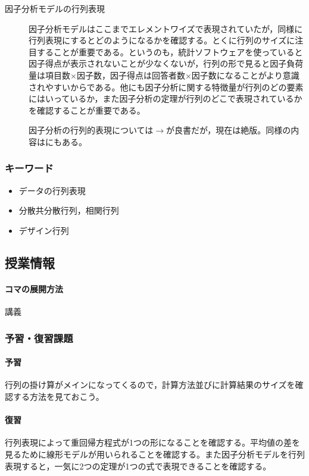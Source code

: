 \begin{description}
	\item[因子分析モデルの行列表現]因子分析モデルはここまでエレメントワイズで表現されていたが，同様に行列表現にするとどのようになるかを確認する。とくに行列のサイズに注目することが重要である。というのも，統計ソフトウェアを使っていると因子得点が表示されないことが少なくないが，行列の形で見ると因子負荷量は項目数$\times$因子数，因子得点は回答者数$\times$因子数になることがより意識されやすいからである。他にも因子分析に関する特徴量が行列のどの要素にはいっているか，また因子分析の定理が行列のどこで表現されているかを確認することが重要である。
	      \begin{flushright}
		      因子分析の行列的表現については$\to$\citet{Shibasuke197901}が良書だが，現在は絶版。同様の内容は\citet{kosugi2018}にもある。
	      \end{flushright}
\end{description}
\subsubsection{キーワード}
\begin{itemize}
	\item データの行列表現
	\item 分散共分散行列，相関行列
	\item デザイン行列
\end{itemize}
\subsection{授業情報}
\paragraph{コマの展開方法}
講義
\subsubsection{予習・復習課題}
\paragraph{予習}行列の掛け算がメインになってくるので，計算方法並びに計算結果のサイズを確認する方法を見ておこう。
\paragraph{復習}行列表現によって重回帰方程式が1つの形になることを確認する。平均値の差を見るために線形モデルが用いられることを確認する。また因子分析モデルを行列表現すると，一気に2つの定理が1つの式で表現できることを確認する。
